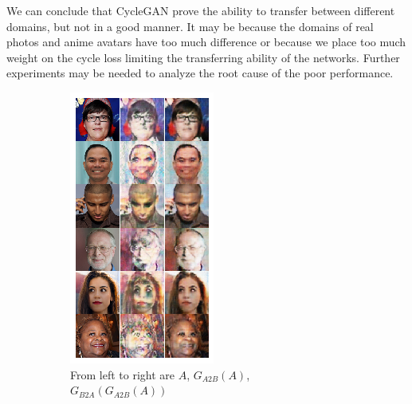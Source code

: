 \documentclass[10pt,twocolumn,letterpaper]{article}
\begin{document}
We can conclude that CycleGAN prove the ability to transfer between different
domains, but not in a good manner. It may be because the domains of real photos
and anime avatars have too much difference or because we place too much weight
on the cycle loss limiting the transferring ability of the networks. Further
experiments may be needed to analyze the root cause of the poor performance.

\begin{figure}[h]
   \centering
   \begin{subfigure}{.48\linewidth}
      \centering
      \includegraphics[width=.7\linewidth]{cycle-result-source.png}
      \caption{From left to right are $A$, $G_{A2B}(A)$, $G_{B2A}(G_{A2B}(A))$}
   \end{subfigure}
   \begin{subfigure}{.48\linewidth}
      \centering

\end{subfigure}
\end{figure}
\end{document}
